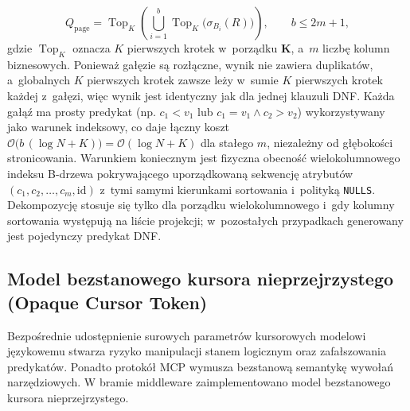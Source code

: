 \begin{equation}
Q_{\text{page}} = \operatorname{Top}_K\!\left( \bigcup_{i=1}^{b} \operatorname{Top}_K\bigl(\sigma_{B_i}(R)\bigr) \right), \qquad b \le 2m + 1,
\label{eq:keyset_union}
\end{equation}
gdzie $\operatorname{Top}_K$ oznacza $K$ pierwszych krotek w~porządku $\mathbf{K}$, a~$m$ liczbę kolumn biznesowych. Ponieważ gałęzie są rozłączne, wynik nie zawiera duplikatów, a~globalnych $K$ pierwszych krotek zawsze leży w~sumie $K$ pierwszych krotek każdej z~gałęzi, więc wynik jest identyczny jak dla jednej klauzuli DNF. Każda gałąź ma prosty predykat (np. $c_1 < v_1$ lub $c_1 = v_1 \land c_2 > v_2$) wykorzystywany jako warunek indeksowy, co daje łączny koszt $\mathcal{O}\bigl(b\,(\log N + K)\bigr) = \mathcal{O}(\log N + K)$ dla stałego $m$, niezależny od głębokości stronicowania. Warunkiem koniecznym jest fizyczna obecność wielokolumnowego indeksu B-drzewa pokrywającego uporządkowaną sekwencję atrybutów $(c_1, c_2, \dots, c_m, \text{id})$ z~tymi samymi kierunkami sortowania i~polityką \texttt{NULLS}. Dekompozycję stosuje się tylko dla porządku wielokolumnowego i~gdy kolumny sortowania występują na liście projekcji; w~pozostałych przypadkach generowany jest pojedynczy predykat DNF.

\subsection{Model bezstanowego kursora nieprzejrzystego (Opaque Cursor Token)}
\label{subsec:projekt_opaque_cursor}

Bezpośrednie udostępnienie surowych parametrów kursorowych modelowi językowemu stwarza ryzyko manipulacji stanem logicznym oraz zafałszowania predykatów. Ponadto protokół MCP wymusza bezstanową semantykę wywołań narzędziowych. W bramie middleware zaimplementowano model bezstanowego kursora nieprzejrzystego.

